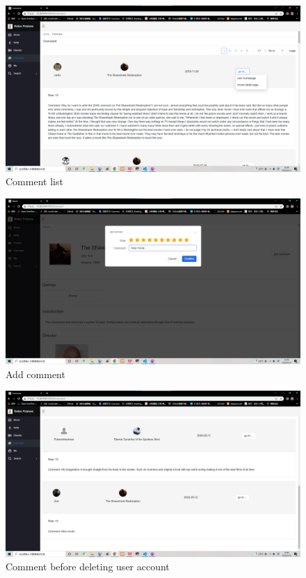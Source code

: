 \begin{CJK*}{UTF8}{gbsn}
\begin{figure}[htbp]
\centering
\includegraphics[width=1\textwidth]{res_comment1.png}
\caption{Comment list}
\end{figure}

\begin{figure}[htbp]
\centering
\includegraphics[width=1\textwidth]{res_comment2.png}
\caption{Add comment}
\end{figure}


\begin{figure}[htbp]
\centering
\includegraphics[width=1\textwidth]{res_comment3.png}
\caption{Comment before deleting user account}
\end{figure}


\end{CJK*}

